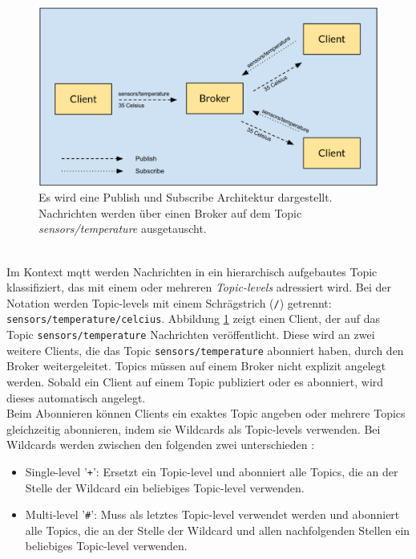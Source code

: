 \begin{figure}
    \centering
    \includegraphics[scale=0.33]{images/publish_subscribe.png}
    \caption{Es wird eine Publish und Subscribe Architektur dargestellt. Nachrichten werden über einen Broker auf dem Topic \textit{sensors/temperature} ausgetauscht.}
    \label{fig:publish-subscribe}
\end{figure}
\\
Im Kontext \ac{mqtt} werden Nachrichten in ein hierarchisch aufgebautes Topic klassifiziert, das mit einem oder mehreren \textit{Topic-levels} adressiert wird.
Bei der Notation werden Topic-levels mit einem Schrägstrich (\verb|/|) getrennt: \verb|sensors/temperature/celcius|.
Abbildung \ref{fig:publish-subscribe} zeigt einen Client, der auf das Topic \verb|sensors/temperature| Nachrichten veröffentlicht. Diese wird an zwei weitere Clients, die das Topic \verb|sensors/temperature| abonniert haben, durch den Broker weitergeleitet. Topics müssen auf einem Broker nicht explizit angelegt werden. Sobald ein Client auf einem Topic publiziert oder es abonniert, wird dieses automatisch angelegt.\cite{WhatMQTTDefinition}\\
Beim Abonnieren können Clients ein exaktes Topic angeben oder mehrere Topics gleichzeitig abonnieren, indem sie Wildcards als Topic-levels verwenden.
Bei Wildcards werden zwischen den folgenden zwei unterschieden \cite{teamMQTTTopicsBest}:
\begin{itemize}
    \item Single-level '\verb|+|': Ersetzt ein Topic-level und abonniert alle Topics, die an der Stelle der Wildcard ein beliebiges Topic-level verwenden.
    \item Multi-level '\verb|#|': Muss als letztes Topic-level verwendet werden und abonniert alle Topics, die an der Stelle der Wildcard und allen nachfolgenden Stellen ein beliebiges Topic-level verwenden.
\end{itemize}
